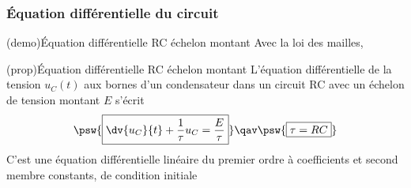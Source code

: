 \documentclass[../../main/main.tex]{subfiles}
\begin{document}
\subsubsection{Équation différentielle du circuit}
\begin{tcb*}[label=demo:eqdiffrc,
		list entry={\lte\thedemo~:~Équa. diff. RC montant}]
	(demo){Équation différentielle RC échelon montant}
	Avec la loi des mailles,
	\vspace{-25pt}
	\vspace{-15pt}
\end{tcb*}
\begin{tcb*}[label=prop:eqdiffrc, sidebyside, righthand ratio=.4,
		list entry={\lte\theprop~:~Équa. diff. RC montant}]
	(prop){Équation différentielle RC échelon montant}
	L'équation différentielle de la tension $u_C(t)$ aux bornes d'un condensateur
	dans un circuit RC avec un échelon de tension montant $E$ s'écrit
	\[
		\psw{%
			\boxed{\dv{u_C}{t} + \frac{1}{\tau}u_C = \frac{E}{\tau}}
		}%
		\qav
		\psw{%
			\boxed{\tau = RC}
		}%
	\]
	\tcblower
	C'est une équation différentielle linéaire du premier ordre à
	coefficients et second membre constants, de condition initiale
	\psw{%
		\[
			\boxed{u_C(0^-) = u_C(0^+) = 0}
		\]
	}%
\end{tcb*}
\end{document}
